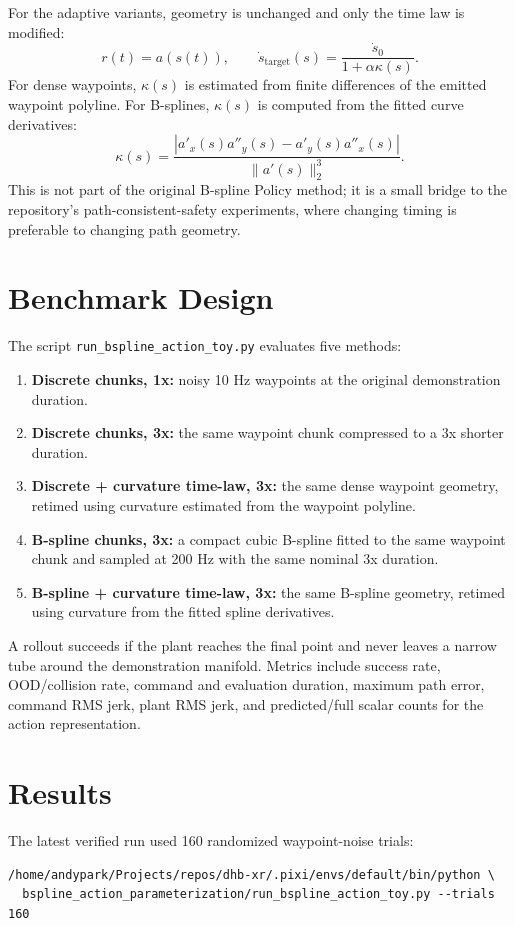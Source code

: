 \documentclass[11pt]{article}
\begin{document}
For the adaptive variants, geometry is unchanged and only the time law is modified:
\[
  r(t) = a(s(t)), \qquad \dot{s}_{\mathrm{target}}(s) = \frac{\dot{s}_0}{1 + \alpha\kappa(s)}.
\]
For dense waypoints, \(\kappa(s)\) is estimated from finite differences of the emitted waypoint polyline. For B-splines, \(\kappa(s)\) is computed from the fitted curve derivatives:
\[
  \kappa(s) = \frac{|a'_x(s)a''_y(s) - a'_y(s)a''_x(s)|}{\|a'(s)\|_2^3}.
\]
This is not part of the original B-spline Policy method; it is a small bridge to the repository's path-consistent-safety experiments, where changing timing is preferable to changing path geometry.

\section{Benchmark Design}

The script \texttt{run\_bspline\_action\_toy.py} evaluates five methods:
\begin{enumerate}[leftmargin=1.5em]
  \item \textbf{Discrete chunks, 1x:} noisy 10 Hz waypoints at the original demonstration duration.
  \item \textbf{Discrete chunks, 3x:} the same waypoint chunk compressed to a 3x shorter duration.
  \item \textbf{Discrete + curvature time-law, 3x:} the same dense waypoint geometry, retimed using curvature estimated from the waypoint polyline.
  \item \textbf{B-spline chunks, 3x:} a compact cubic B-spline fitted to the same waypoint chunk and sampled at 200 Hz with the same nominal 3x duration.
  \item \textbf{B-spline + curvature time-law, 3x:} the same B-spline geometry, retimed using curvature from the fitted spline derivatives.
\end{enumerate}

A rollout succeeds if the plant reaches the final point and never leaves a narrow tube around the demonstration manifold. Metrics include success rate, OOD/collision rate, command and evaluation duration, maximum path error, command RMS jerk, plant RMS jerk, and predicted/full scalar counts for the action representation.

\section{Results}

The latest verified run used 160 randomized waypoint-noise trials:
\begin{verbatim}
/home/andypark/Projects/repos/dhb-xr/.pixi/envs/default/bin/python \
  bspline_action_parameterization/run_bspline_action_toy.py --trials 160
\end{verbatim}
\end{document}
